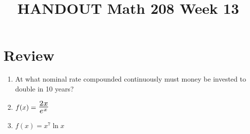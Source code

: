 \documentclass[14pt]{extarticle}
\title{\vspace{-5ex}HANDOUT Math 208 Week 13}
\date{\vspace{-10ex}}
\newcommand*{\Scale}[2][1.5]{\scalebox{#1}{\ensuremath{#2}}}%
\begin{document}
\maketitle		

\section{Review}
\begin{enumerate}
	\item At what nominal rate compounded continuously must money be invested to double in 10 years?
	\vspace{2.5cm}

	\item $f(x) = \Scale[1.5]{\frac{2x}{e^x}}$
	\vspace{2.5cm}
	
	\item $ f(x) = x^7\ln x$
	\vspace{2.5cm}
	
\end{enumerate}
\end{document}
